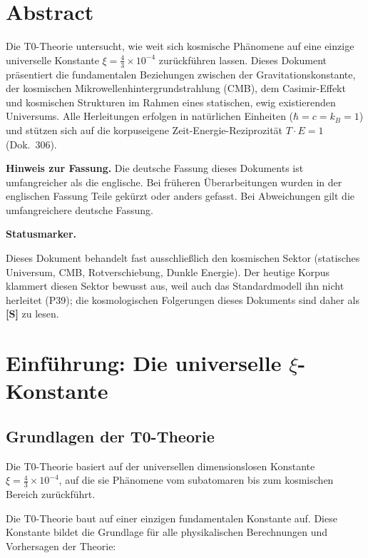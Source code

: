 \section*{Abstract}
		Die T0-Theorie untersucht, wie weit sich kosmische Phänomene auf eine einzige universelle Konstante $\xi = \frac{4}{3} \times 10^{-4}$ zurückführen lassen. Dieses Dokument präsentiert die fundamentalen Beziehungen zwischen der Gravitationskonstante, der kosmischen Mikrowellenhintergrundstrahlung (CMB), dem Casimir-Effekt und kosmischen Strukturen im Rahmen eines statischen, ewig existierenden Universums. Alle Herleitungen erfolgen in natürlichen Einheiten ($\hbar = c = k_B = 1$) und stützen sich auf die korpuseigene Zeit-Energie-Reziprozität $T\cdot E = 1$ (Dok.~306).

	\medskip\noindent\textbf{Hinweis zur Fassung.} Die deutsche Fassung dieses Dokuments ist umfangreicher als die englische. Bei früheren Überarbeitungen wurden in der englischen Fassung Teile gekürzt oder anders gefasst. Bei Abweichungen gilt die umfangreichere deutsche Fassung.


	\medskip\noindent\textbf{Statusmarker.}
	

	\noindent Dieses Dokument behandelt fast ausschließlich den kosmischen Sektor (statisches Universum, CMB, Rotverschiebung, Dunkle Energie). Der heutige Korpus klammert diesen Sektor bewusst aus, weil auch das Standardmodell ihn nicht herleitet (P39); die kosmologischen Folgerungen dieses Dokuments sind daher als \textbf{[S]} zu lesen.

	
	
	\section{Einführung: Die universelle $\xi$-Konstante}
	
\subsection{Grundlagen der T0-Theorie}

\begin{important}
	Die T0-Theorie basiert auf der universellen dimensionslosen Konstante $\xi = \frac{4}{3} \times 10^{-4}$, auf die sie Phänomene vom subatomaren bis zum kosmischen Bereich zurückführt.
\end{important}

Die T0-Theorie baut auf einer einzigen fundamentalen Konstante auf. Diese Konstante bildet die Grundlage für alle physikalischen Berechnungen und Vorhersagen der Theorie:

